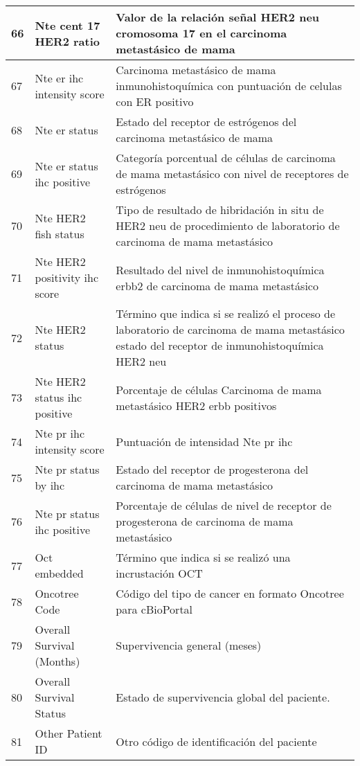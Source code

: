 \begin{table*} [!htb]
\begin{threeparttable}
\begin{tabular}{p{1cm} p{4cm} p{10cm}}
			\\ \hline	66	&	Nte cent 17 HER2 ratio	&	Valor de la relación señal HER2 neu cromosoma 17 en el carcinoma metastásico de mama 
			\\ \hline	67	&	Nte er ihc intensity score	&	Carcinoma metastásico de mama inmunohistoquímica con puntuación de celulas con ER positivo
			\\ \hline	68	&	Nte er status	&	Estado del receptor de estrógenos del carcinoma metastásico de mama
			\\ \hline	69	&	Nte er status ihc positive	&	Categoría porcentual de células de carcinoma de mama metastásico con nivel de receptores de estrógenos
			\\ \hline	70	&	Nte HER2 fish status	&	Tipo de resultado de hibridación in situ de HER2 neu de procedimiento de laboratorio de carcinoma de mama metastásico
			\\ \hline	71	&	Nte HER2 positivity ihc score	&	Resultado del nivel de inmunohistoquímica erbb2 de carcinoma de mama metastásico
			\\ \hline	72	&	Nte HER2 status	&	Término que indica si se realizó el proceso de laboratorio de carcinoma de mama metastásico estado del receptor de inmunohistoquímica HER2 neu
			\\ \hline	73	&	Nte HER2 status ihc positive	&	Porcentaje de células Carcinoma de mama metastásico HER2 erbb positivos 
			\\ \hline	74	&	Nte pr ihc intensity score	&	Puntuación de intensidad Nte pr ihc
			\\ \hline	75	&	Nte pr status by ihc	&	Estado del receptor de progesterona del carcinoma de mama metastásico
			\\ \hline	76	&	Nte pr status ihc positive	&	Porcentaje de células de nivel de receptor de progesterona de carcinoma de mama metastásico
			\\ \hline	77	&	Oct embedded	&	Término que indica si se realizó una incrustación OCT
			\\ \hline	78	&	Oncotree Code	&	Código del tipo de cancer en formato Oncotree para cBioPortal
			\\ \hline	79	&	Overall Survival (Months)	&	Supervivencia general (meses)
			\\ \hline	80	&	Overall Survival Status	&	Estado de supervivencia global del paciente.
			\\ \hline	81	&	Other Patient ID	&	Otro código de identificación del paciente
			\\ \hline
		\end{tabular}
	\end{threeparttable}
\end{table*}

